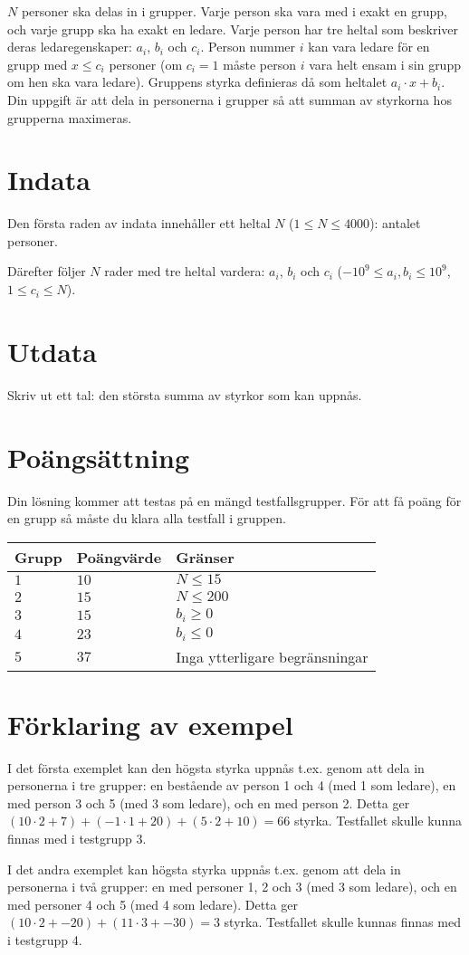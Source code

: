 
$N$ personer ska delas in i grupper.
Varje person ska vara med i exakt en grupp, och varje grupp ska ha exakt en ledare.
Varje person har tre heltal som beskriver deras ledaregenskaper: $a_i$, $b_i$ och $c_i$.
Person nummer $i$ kan vara ledare för en grupp med $x \le c_i$ personer
(om $c_i=1$ måste person $i$ vara helt ensam i sin grupp om hen ska vara ledare).
Gruppens styrka definieras då som heltalet $a_i\cdot x + b_i$.
Din uppgift är att dela in personerna i grupper så att summan av styrkorna hos grupperna maximeras.

\section*{Indata}
Den första raden av indata innehåller ett heltal $N$ ($1 \le N \le 4000$): antalet personer.

Därefter följer $N$ rader med tre heltal vardera: $a_i$, $b_i$ och $c_i$ ($-10^9 \le a_i, b_i \le 10^9$, $1 \le c_i \le N$).

\section*{Utdata}

Skriv ut ett tal: den största summa av styrkor som kan uppnås.

\section*{Poängsättning}
Din lösning kommer att testas på en mängd testfallsgrupper.
För att få poäng för en grupp så måste du klara alla testfall i gruppen.

\noindent
\begin{tabular}{| l | l | l |}
  \hline
  Grupp & Poängvärde & Gränser \\ \hline
  $1$   & $10$       &  $N \le 15$ \\ \hline
  $2$   & $15$       &  $N \le 200$ \\ \hline
  $3$   & $15$       &  $b_i \ge 0$ \\ \hline
  $4$   & $23$       &  $b_i \le 0$ \\ \hline
  $5$   & $37$       &  Inga ytterligare begränsningar \\ \hline
\end{tabular}

\section*{Förklaring av exempel}
I det första exemplet kan den högsta styrka uppnås t.ex. genom att dela in personerna i tre grupper:
en bestående av person 1 och 4 (med 1 som ledare), en med person 3 och 5 (med 3 som ledare), och en med person 2.
Detta ger $(10 \cdot 2 + 7) + (-1 \cdot 1 + 20) + (5 \cdot 2 + 10) = 66$ styrka.
Testfallet skulle kunna finnas med i testgrupp 3.

I det andra exemplet kan högsta styrka uppnås t.ex. genom att dela in personerna i två grupper:
en med personer 1, 2 och 3 (med 3 som ledare), och en med personer 4 och 5 (med 4 som ledare).
Detta ger $(10 \cdot 2 + -20) + (11 \cdot 3 + -30) = 3$ styrka.
Testfallet skulle kunnas finnas med i testgrupp 4.
